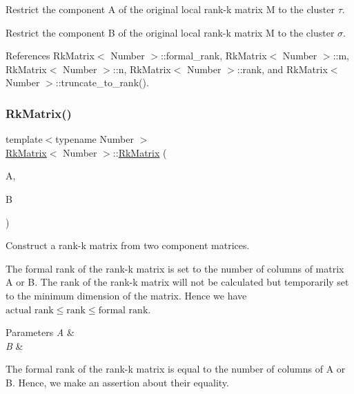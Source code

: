 Restrict the component {\ttfamily A} of the original local rank-\/k matrix {\ttfamily M} to the cluster $\tau$.

Restrict the component {\ttfamily B} of the original local rank-\/k matrix {\ttfamily M} to the cluster $\sigma$.

References Rk\+Matrix$<$ Number $>$\+::formal\+\_\+rank, Rk\+Matrix$<$ Number $>$\+::m, Rk\+Matrix$<$ Number $>$\+::n, Rk\+Matrix$<$ Number $>$\+::rank, and Rk\+Matrix$<$ Number $>$\+::truncate\+\_\+to\+\_\+rank().

\mbox{\label{classRkMatrix_a22cbf825bdbff58434ab3d4a6c478b96}} 
\subsubsection{\texorpdfstring{Rk\+Matrix()}{RkMatrix()}\hspace{0.1cm}{\footnotesize\ttfamily [13/18]}}
{\footnotesize\ttfamily template$<$typename Number $>$ \\
\hyperlink{classRkMatrix}{Rk\+Matrix}$<$ Number $>$\+::\hyperlink{classRkMatrix}{Rk\+Matrix} (\begin{DoxyParamCaption}\item[{const \hyperlink{classLAPACKFullMatrixExt}{L\+A\+P\+A\+C\+K\+Full\+Matrix\+Ext}$<$ Number $>$ \&}]{A,  }\item[{const \hyperlink{classLAPACKFullMatrixExt}{L\+A\+P\+A\+C\+K\+Full\+Matrix\+Ext}$<$ Number $>$ \&}]{B }\end{DoxyParamCaption})}

Construct a rank-\/k matrix from two component matrices.


\begin{DoxyDescription}
\item[Note ]The formal rank of the rank-\/k matrix is set to the number of columns of matrix {\ttfamily A} or {\ttfamily B}. The rank of the rank-\/k matrix will not be calculated but temporarily set to the minimum dimension of the matrix. Hence we have $\text{actual rank} \leq \text{rank} \leq \text{formal rank}$. 
\end{DoxyDescription}
\begin{DoxyParams}{Parameters}
{\em A} & \\
\hline
{\em B} & \\
\hline
\end{DoxyParams}
The formal rank of the rank-\/k matrix is equal to the number of columns of {\ttfamily A} or {\ttfamily B}. Hence, we make an assertion about their equality.\mbox{\label{classRkMatrix_ae15a15d55d04dd677a8dc90dbf789674}} 
